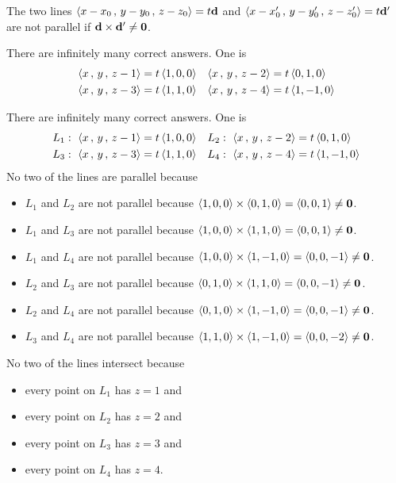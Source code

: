 \begin{hint}
The two lines $\left< x-x_0\,,\,y-y_0\,,\,z-z_0\right> =t\mathbf{d}$ and
$\left< x-x'_0\,,\,y-y'_0\,,\,z-z'_0\right> =t\mathbf{d}'$ are not parallel if
$\mathbf{d}\times\mathbf{d}'\ne\mathbf{0}$.
\end{hint}


\begin{answer}
There are infinitely many correct answers. One is
\begin{align*}
\left< x\,,\,y\,,\,z-1\right> &= t\left< 1,0,0\right> &
\left< x\,,\,y\,,\,z-2\right> &= t\left< 0,1,0\right> \\
\left< x\,,\,y\,,\,z-3\right> &= t\left< 1,1,0\right> &
\left< x\,,\,y\,,\,z-4\right> &= t\left< 1,-1,0\right> 
\end{align*}
 
\end{answer}
\begin{solution}
There are infinitely many correct answers. One is
\begin{align*}
L_1:\ \left< x\,,\,y\,,\,z-1\right> &= t\left< 1,0,0\right> &
L_2:\ \left< x\,,\,y\,,\,z-2\right> &= t\left< 0,1,0\right> \\
L_3:\ \left< x\,,\,y\,,\,z-3\right> &= t\left< 1,1,0\right> &
L_4:\ \left< x\,,\,y\,,\,z-4\right> &= t\left< 1,-1,0\right> 
\end{align*}
No two of the lines are parallel because
\begin{itemize}
\item
$L_1$ and $L_2$ are not parallel because
$\left< 1,0,0\right>\times \left< 0,1,0\right>=\left< 0,0,1\right>\ne\mathbf{0}$.
\item
$L_1$ and $L_3$ are not parallel because
$\left< 1,0,0\right>\times \left< 1,1,0\right>=\left< 0,0,1\right>\ne\mathbf{0}$.
\item
$L_1$ and $L_4$ are not parallel because
$\left< 1,0,0\right>\times \left< 1,-1,0\right>=\left< 0,0,-1\right>\ne\mathbf{0}$.
\item
$L_2$ and $L_3$ are not parallel because
$\left< 0,1,0\right>\times \left< 1,1,0\right>=\left< 0,0,-1\right>\ne\mathbf{0}$.
\item
$L_2$ and $L_4$ are not parallel because
$\left< 0,1,0\right>\times \left< 1,-1,0\right>=\left< 0,0,-1\right>\ne\mathbf{0}$.
\item
$L_3$ and $L_4$ are not parallel because
$\left< 1,1,0\right>\times \left< 1,-1,0\right>=\left< 0,0,-2\right>\ne\mathbf{0}$.
\end{itemize}
No two of the lines intersect because
\begin{itemize}
\item every point on $L_1$ has $z=1$ and
\item every point on $L_2$ has $z=2$ and
\item every point on $L_3$ has $z=3$ and
\item every point on $L_4$ has $z=4$.
\end{itemize}
\end{solution}


